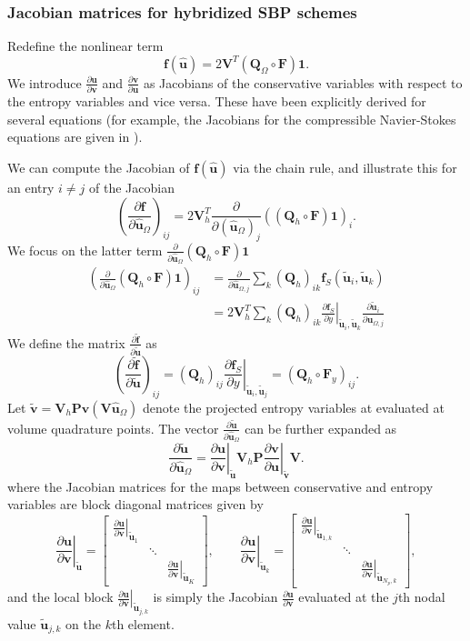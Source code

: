 \documentclass{article}
\renewcommand{\hat}{\widehat}
\renewcommand{\tilde}{\widetilde}
\newcommand{\pd}[2]{\frac{\partial#1}{\partial#2}}
\newcommand{\LRp}[1]{\left( #1 \right)}
\newcommand{\LRl}[1]{\left. #1 \right|}
\newcommand{\eq}[1]{\begin{align*}#1\end{align*}}
\newcommand{\bmat}[1]{\begin{bmatrix}#1\end{bmatrix}}
\begin{document}
\subsubsection{Jacobian matrices for hybridized SBP schemes}

Redefine the nonlinear term 
\[
\bm{f}(\hat{\bm{u}}) = 2\bm{V}^T\LRp{ \bm{Q}_{\Omega} \circ \bm{F}}\bm{1}.
\]
We introduce $\pd{\bm{u}}{\bm{v}}$ and $\pd{\bm{v}}{\bm{u}}$ as Jacobians of the conservative variables with respect to the entropy variables and vice versa.  These have been explicitly derived for several equations (for example, the Jacobians for the compressible Navier-Stokes equations are given in \cite{hughes1986new}).  

We can compute the Jacobian of $\bm{f}(\hat{\bm{u}})$ via the chain rule, and illustrate this for an entry $i\neq j$ of the Jacobian
\[
\LRp{\pd{\bm{f}}{\hat{\bm{u}}_{\Omega}}}_{ij} =  2 \bm{V}_h^T \pd{}{\LRp{\hat{\bm{u}}_{\Omega}}_j} \LRp{\LRp{\bm{Q}_h\circ\bm{F}}\bm{1}}_i.
\]
We focus on the latter term $\pd{}{\hat{\bm{u}}_{\Omega}} \LRp{\bm{Q}_h\circ\bm{F}}\bm{1}$
\eq{
\LRp{\pd{}{\hat{\bm{u}}_{\Omega}} \LRp{\bm{Q}_h\circ\bm{F}}\bm{1}}_{ij} &= \pd{}{\hat{\bm{u}}_{\Omega,j}} \sum_{k} \LRp{\bm{Q}_h}_{ik} \bm{f}_S\LRp{\tilde{\bm{u}}_i,\tilde{\bm{u}}_k} \\
&=  2 \bm{V}_h^T \sum_{k} \LRp{\bm{Q}_h}_{ik} \LRl{\pd{\bm{f}_S}{y}}_{\tilde{\bm{u}}_i,\tilde{\bm{u}}_k} \pd{\tilde{\bm{u}}_i}{\hat{\bm{u}}_{\Omega,j}}
}
We define the matrix $\pd{\tilde{\bm{f}}}{\tilde{\bm{u}}}$ as
\[
\LRp{\pd{\tilde{\bm{f}}}{\tilde{\bm{u}}}}_{ij} = \LRp{\bm{Q}_h}_{ij} \LRl{\pd{\bm{f}_S}{y}}_{\tilde{\bm{u}}_i,\tilde{\bm{u}}_j} = \LRp{\bm{Q}_h\circ \bm{F}_y}_{ij}.
\]
Let $\tilde{\bm{v}} = \bm{V}_h\bm{P}\bm{v}\LRp{\bm{V}\hat{\bm{u}}_{\Omega}}$ denote the projected entropy variables at evaluated at volume quadrature points.
The vector $\pd{\tilde{\bm{u}}}{\hat{\bm{u}}_{\Omega}}$  can be further expanded as 
\[
\pd{\tilde{\bm{u}}}{\hat{\bm{u}}_{\Omega}} = \LRl{\pd{\bm{u}}{\bm{v}}}_{\tilde{\bm{u}}} \bm{V}_h \bm{P} \LRl{\pd{\bm{v}}{\bm{u}}}_{\tilde{\bm{v}}} \bm{V}.
\]
where the Jacobian matrices for the maps between conservative and entropy variables are block diagonal matrices given by
\[
\LRl{\pd{\bm{u}}{\bm{v}}}_{\tilde{\bm{u}}} = \bmat{
\LRl{\pd{\bm{u}}{\bm{v}}}_{\tilde{\bm{u}}_1} &&\\
& \ddots &\\
&& \LRl{\pd{\bm{u}}{\bm{v}}}_{\tilde{\bm{u}}_K}
}, \qquad \LRl{\pd{\bm{u}}{\bm{v}}}_{\tilde{\bm{u}}_k} = \bmat{
\LRl{\pd{\bm{u}}{\bm{v}}}_{\tilde{\bm{u}}_{1,k}} &&\\
 &\ddots &\\
&& \LRl{\pd{\bm{u}}{\bm{v}}}_{\tilde{\bm{u}}_{N_p,k}}
},
\]
and the local block $\LRl{\pd{\bm{u}}{\bm{v}}}_{\tilde{\bm{u}}_{j,k}}$ is simply the Jacobian $\pd{\bm{u}}{\bm{v}}$ evaluated at the $j$th nodal value $\tilde{\bm{u}}_{j,k}$ on the $k$th element.
\end{document}
